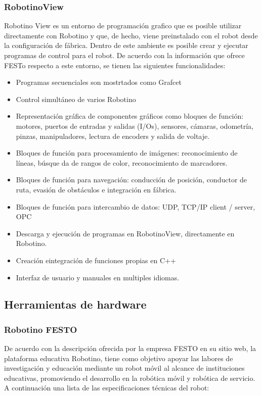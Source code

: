             \cite{ROS_concepts_MoveIt}
             
            \subsubsection{RobotinoView}
            Robotino View es un entorno de programación grafico que es posible utilizar directamente con Robotino y que, de hecho, viene preinstalado con el robot desde la configuración de fábrica. Dentro de este ambiente es posible crear y ejecutar programas de control para el robot.
            De acuerdo con la información que ofrece FESTo respecto a este entorno, se tienen las siguientes funcionalidades:
            \begin{itemize}
                \item Programas secuenciales son mostrtados como Grafcet
                \item Control simultáneo de varios Robotino
                \item Representación gráfica de componentes gráficos como bloques de función: motores, puertos de entradas y salidas (I/Os), sensores, cámaras, odometría, pinzas, manipuladores, lectura de encoders y salida de voltaje.
                \item Bloques de función para procesamiento de imágenes: reconocimiento de líneas, búsque da de rangos de color, reconocimiento de marcadores.
                \item Bloques de función para navegación: conducción de posición, conductor de ruta, evasión de obstáculos e integración en fábrica.
                \item Bloques de función para intercambio de datos: UDP, TCP/IP client / server, OPC
                \item Descarga y ejecución de programas en RobotinoView, directamente en Robotino.
                \item Creación eintegración de funciones propias en C++
                \item Interfaz de usuario y manuales en multiples idiomas.
            \end{itemize} \cite{FESTO-RobotinoView}
            
        \subsection{Herramientas de hardware}
            \subsubsection{Robotino FESTO}
            De acuerdo con la descripción ofrecida por la empresa FESTO en su sitio web, la plataforma educativa Robotino, tiene como objetivo apoyar las labores de investigación y educación mediante un robot móvil al alcance de instituciones educativas, promoviendo el desarrollo en la robótica móvil y robótica de servicio. A continuación una lista de las especificaciones técnicas del robot:
            \phantom{saltodelineaforzado >:D}\\
            
